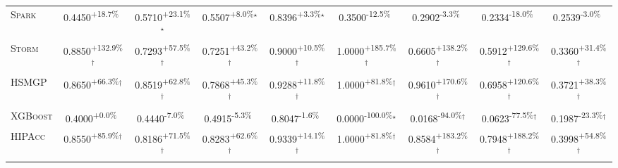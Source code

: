 \begin{table}[htbp]
\begin{tabular}{l|cccc|cccc}
\textsc{Spark} & \cellcolor{green!30}0.4450\textsuperscript{+18.7\%}$^{\,\,\,}$ & \cellcolor{green!30}0.5710\textsuperscript{+23.1\%}$^\star$ & \cellcolor{green!30}0.5507\textsuperscript{+8.0\%}$^\star$ & \cellcolor{green!30}0.8396\textsuperscript{+3.3\%}$^\star$ & \cellcolor{red!30}0.3500\textsuperscript{-12.5\%}$^{\,\,\,}$ & \cellcolor{red!30}0.2902\textsuperscript{-3.3\%}$^{\,\,\,}$ & \cellcolor{red!30}0.2334\textsuperscript{-18.0\%}$^{\,\,\,}$ & \cellcolor{red!30}0.2539\textsuperscript{-3.0\%}$^{\,\,\,}$ \\
\textsc{Storm} & \cellcolor{green!30}0.8850\textsuperscript{+132.9\%}$^\dagger$ & \cellcolor{green!30}0.7293\textsuperscript{+57.5\%}$^\dagger$ & \cellcolor{green!30}0.7251\textsuperscript{+43.2\%}$^\dagger$ & \cellcolor{green!30}0.9000\textsuperscript{+10.5\%}$^\dagger$ & \cellcolor{green!30}1.0000\textsuperscript{+185.7\%}$^\dagger$ & \cellcolor{green!30}0.6605\textsuperscript{+138.2\%}$^\dagger$ & \cellcolor{green!30}0.5912\textsuperscript{+129.6\%}$^\dagger$ & \cellcolor{green!30}0.3360\textsuperscript{+31.4\%}$^\dagger$ \\
\textsc{HSMGP} & \cellcolor{green!30}0.8650\textsuperscript{+66.3\%}$^\dagger$ & \cellcolor{green!30}0.8519\textsuperscript{+62.8\%}$^\dagger$ & \cellcolor{green!30}0.7868\textsuperscript{+45.3\%}$^\dagger$ & \cellcolor{green!30}0.9288\textsuperscript{+11.8\%}$^\dagger$ & \cellcolor{green!30}1.0000\textsuperscript{+81.8\%}$^\dagger$ & \cellcolor{green!30}0.9610\textsuperscript{+170.6\%}$^\dagger$ & \cellcolor{green!30}0.6958\textsuperscript{+120.6\%}$^\dagger$ & \cellcolor{green!30}0.3721\textsuperscript{+38.3\%}$^\dagger$ \\
\textsc{XGBoost} & \cellcolor{green!30}0.4000\textsuperscript{+0.0\%}$^{\,\,\,}$ & \cellcolor{red!30}0.4440\textsuperscript{-7.0\%}$^{\,\,\,}$ & \cellcolor{red!30}0.4915\textsuperscript{-5.3\%}$^{\,\,\,}$ & \cellcolor{red!30}0.8047\textsuperscript{-1.6\%}$^{\,\,\,}$ & \cellcolor{red!30}0.0000\textsuperscript{-100.0\%}$^\star$ & \cellcolor{red!30}0.0168\textsuperscript{-94.0\%}$^\dagger$ & \cellcolor{red!30}0.0623\textsuperscript{-77.5\%}$^\dagger$ & \cellcolor{red!30}0.1987\textsuperscript{-23.3\%}$^\dagger$ \\
\textsc{HIPAcc} & \cellcolor{green!30}0.8550\textsuperscript{+85.9\%}$^\dagger$ & \cellcolor{green!30}0.8186\textsuperscript{+71.5\%}$^\dagger$ & \cellcolor{green!30}0.8283\textsuperscript{+62.6\%}$^\dagger$ & \cellcolor{green!30}0.9339\textsuperscript{+14.1\%}$^\dagger$ & \cellcolor{green!30}1.0000\textsuperscript{+81.8\%}$^\dagger$ & \cellcolor{green!30}0.8584\textsuperscript{+183.2\%}$^\dagger$ & \cellcolor{green!30}0.7948\textsuperscript{+188.2\%}$^\dagger$ & \cellcolor{green!30}0.3998\textsuperscript{+54.8\%}$^\dagger$ \\

\end{tabular}
\end{table}
